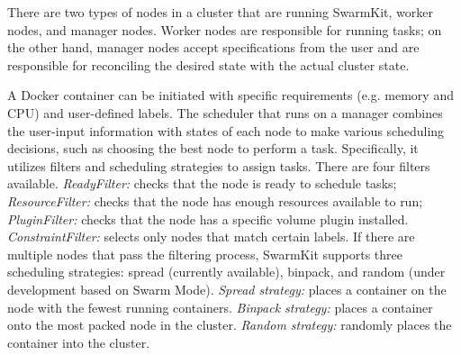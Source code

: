There are two types of nodes in a cluster that are running SwarmKit, worker nodes, and manager nodes.
Worker nodes are responsible for running tasks; on the other hand, 
manager nodes accept specifications from the user and are responsible for reconciling the desired state with the actual cluster state. 

 A Docker container can be initiated with specific requirements (e.g. memory and CPU) and user-defined labels.
The scheduler that runs on a manager combines the user-input information with states of each node to make various scheduling decisions, 
such as choosing the best node to perform a task. 
Specifically, it utilizes filters and scheduling strategies to assign tasks. 
There are four filters available.
\emph{ReadyFilter:} checks that the node is ready to schedule tasks;
\emph{ResourceFilter:} checks that the node has enough resources available to run;
\emph{PluginFilter:} checks that the node has a specific volume plugin installed.
\emph{ConstraintFilter:} selects only nodes that match certain labels.
If there are multiple nodes that pass the filtering process, 
SwarmKit supports three scheduling strategies: spread (currently available), binpack, and random (under development based on Swarm Mode). 
\emph{Spread strategy:} places a container on the node with the fewest running containers.
\emph{Binpack strategy:} places a container onto the most packed node in the cluster.
\emph{Random strategy:} randomly places the container into the cluster.

